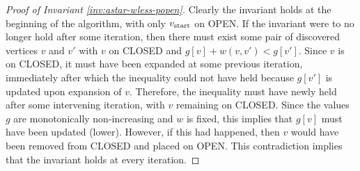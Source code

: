 \begin{proof}[Proof of Invariant \ref{inv:astar-wless-popen}]
Clearly the invariant holds at the beginning of the algorithm,
with only $v_{\mbox{\scriptsize start}}$ on OPEN.
If the invariant were to no longer hold after some iteration,
then there must exist some pair of discovered vertices $v$ and $v'$
with $v$ on CLOSED and $g[v] + w(v,v') < g[v']$.
Since $v$ is on CLOSED,
it must have been expanded at some previous iteration,
immediately after which the inequality could not have held
because $g[v']$ is updated upon expansion of $v$.
Therefore,
the inequality must have newly held after some intervening iteration,
with $v$ remaining on CLOSED.
Since the values $g$ are monotonically non-increasing and $w$ is fixed,
this implies that $g[v]$ must have been updated (lower).
However,
if this had happened,
then $v$ would have been removed from CLOSED and placed on OPEN.
This contradiction implies that the invariant holds at every iteration.
\end{proof}

